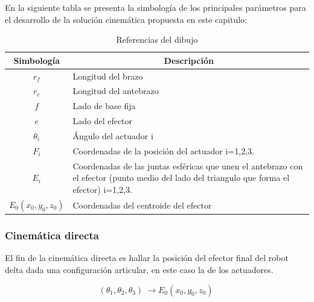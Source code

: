         En la siguiente tabla se presenta la simbología de los principales parámetros para el desarrollo de la solución cinemática propuesta en este capitulo: 
        
        \begingroup
            \renewcommand{\arraystretch}{1.5}
            \begin{table}[H]
            \centering
            \begin{tabular}{c m{12cm}}
               \hline
               \textbf{Simbología}  & \multicolumn{1}{c|}{\textbf{Descripción}}  \\\hline\hline
                $r_{f}$  & Longitud del brazo                                    \\\hline
               $r_{e}$  & Longitud del antebrazo                                \\\hline               
               $f$  & Lado de base fija                                         \\\hline
               $e$  & Lado del efector                                          \\\hline
               $\theta_{i}$  & Ángulo del actuador i    \\\hline
               $F_{i}$  & Coordenadas de la posición del actuador i=1,2,3.    \\\hline
               $E_{i}$  & Coordenadas de las juntas esféricas que unen el antebrazo con el efector (punto medio del lado
               del triangulo que forma el efector) i=1,2,3.    \\\hline
               $E_{0}(x_{0},y_{0},z_{0})$  & Coordenadas del centroide del efector   \\\hline               
            \end{tabular}
            \caption{Referencias del dibujo}
            \label{tab:cap4_tabla_2}
        \end{table}
        \endgroup
        
        
        
        
        \newpage

    
        \subsubsection{Cinemática directa} \label{ma_cd}
        El fin de la cinemática directa es hallar la posición del efector final del robot delta dada una configuración articular, en este caso la de los actuadores.

        \begin{equation}
            \left({\theta }_1,{\theta }_2,{\theta }_3\right)\ \to E_0(x_0,y_0,z_0)\
        \end{equation}

